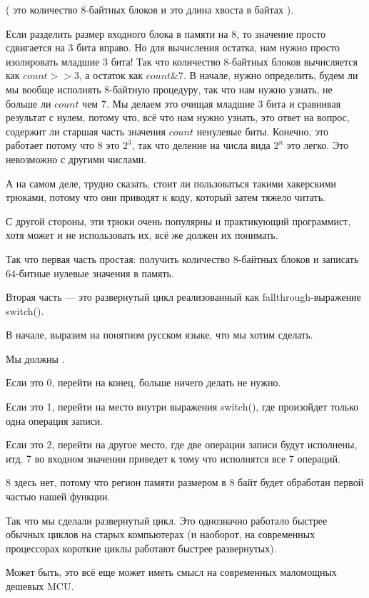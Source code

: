 (  это количество 8-байтных блоков и  это длина хвоста в байтах ).

Если разделить размер входного блока в памяти на 8, то значение просто сдвигается на 3 бита вправо.
Но для вычисления остатка, нам нужно просто изолировать младшие 3 бита!
Так что количество 8-байтных блоков вычисляется как $count>>3$, а остаток как $count \& 7$.
В начале, нужно определить, будем ли мы вообще исполнять 8-байтную процедуру,
так что нам нужно узнать, не больше ли $count$ чем 7.
Мы делаем это очищая младшие 3 бита и сравнивая результат с нулем, потому что,
всё что нам нужно узнать, это ответ на вопрос, содержит ли старшая часть значения $count$ ненулевые биты.
Конечно, это работает потому что 8 это $2^{3}$, так что деление на числа вида $2^n$ это легко.
Это невозможно с другими числами.

А на самом деле, трудно сказать, стоит ли пользоваться такими хакерскими трюками, потому что они
приводят к коду, который затем тяжело читать.

С другой стороны, эти трюки очень популярны и практикующий программист, хотя может и не использовать
их, всё же должен их понимать.

Так что первая часть простая: получить количество 8-байтных блоков и записать 64-битные нулевые значения
в память.

Вторая часть --- это развернутый цикл реализованный как fallthrough-выражение switch().

В начале, выразим на понятном русском языке, что мы хотим сделать.

Мы должны .

Если это 0, перейти на конец, больше ничего делать не нужно.

Если это 1, перейти на место внутри выражения switch(), где произойдет только одна операция записи.

Если это 2, перейти на другое место, где две операции записи будут исполнены, итд.
7 во входном значении приведет к тому что исполнятся все 7 операций.

8 здесь нет, потому что регион памяти размером в 8 байт будет обработан первой частью нашей функции.

Так что мы сделали развернутый цикл.
Это однозначно работало быстрее обычных циклов на старых компьютерах
(и наоборот, на современных процессорах короткие циклы работают быстрее развернутых).

Может быть, это всё еще может иметь смысл на современных маломощных дешевых \ac{MCU}.


